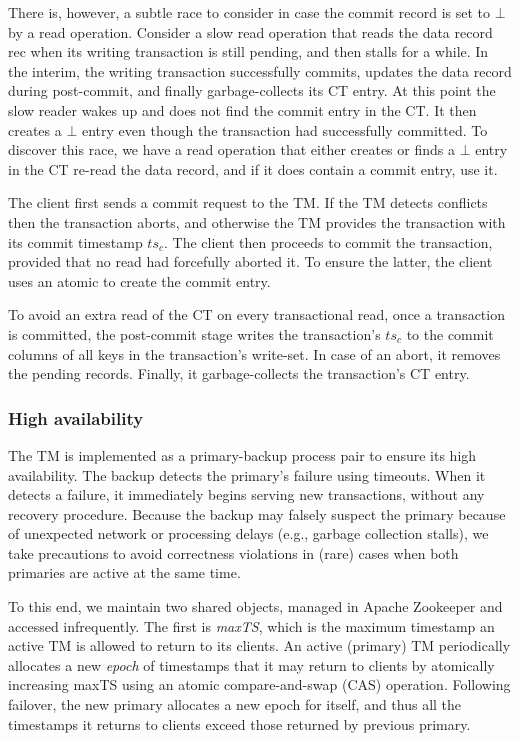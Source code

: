 There is, however, a subtle race to consider in case the commit record is set to $\bot$ by a read operation. 
Consider a slow read operation that reads the data record rec when its writing transaction is still pending, and then stalls
for a while. In the interim, the writing transaction successfully commits, updates the data record during post-commit, 
and finally garbage-collects its  CT entry.  At this point the slow reader wakes up 
and does not find the commit entry in the CT. It then creates a $\bot$ entry even though the transaction had successfully committed.
To discover this race, we have a read operation that either creates or finds a $\bot$ entry in the CT re-read the data record, and 
if it does contain a commit entry, use it. 

The client first 
sends a commit request to the TM. 
If the TM detects conflicts then the transaction aborts, and otherwise the TM provides the transaction with its commit  timestamp $ts_c$. 
The client then proceeds to commit the transaction, provided that no read had forcefully aborted  it. To ensure the latter, the client uses 
an atomic  to create the commit entry. 

To avoid an extra read of the CT on every transactional read, once a transaction is committed, the post-commit stage writes 
the transaction's $ts_c$ to the commit columns of all keys in  the transaction's write-set. 
In case of an abort, it removes the pending records.
Finally, it garbage-collects the transaction's CT entry. 


\subsubsection{High availability} The TM is implemented as a primary-backup process pair to ensure its high availability. 
The backup detects the primary's failure using timeouts. When it detects a failure, it immediately begins serving new
transactions, without any recovery procedure. Because the backup may falsely suspect the primary because of
unexpected network or processing delays (e.g., garbage collection stalls), we take precautions to avoid correctness
violations in (rare) cases when both primaries are active at the same time.

To this end, we maintain two shared objects, managed in Apache Zookeeper and accessed infrequently.
The first is \emph{maxTS}, which is the maximum timestamp an active TM is allowed to return to its clients.
An active (primary) TM periodically allocates a new \emph{epoch} of timestamps that it may return to clients by atomically
increasing maxTS using an atomic compare-and-swap (CAS) operation.  
Following failover, the new primary  allocates a new epoch for itself, and thus all the timestamps it returns to clients
exceed those returned by previous primary. 

